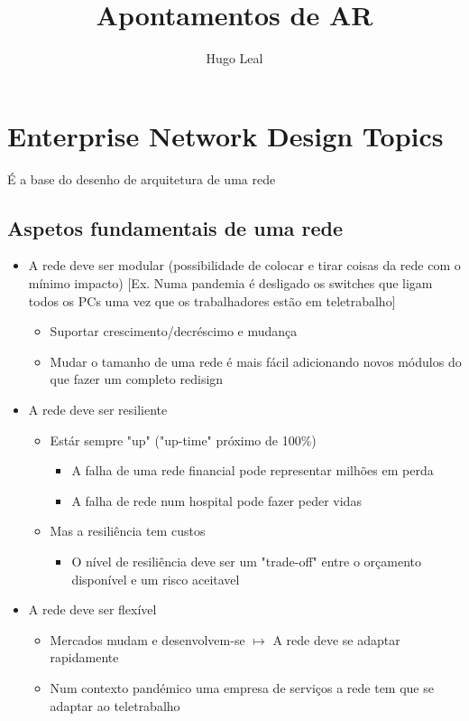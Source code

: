 \documentclass{easyclass}
\begin{document}
\begin{titlepage}
    \title{Apontamentos de AR}
    \author{Hugo Leal}
    \maketitle
\end{titlepage}

\tableofcontents
\clearpage

\section{Enterprise Network Design Topics}
É a base do desenho de arquitetura de uma rede 
\subsection{Aspetos fundamentais de uma rede}
\begin{itemize}
    \item A rede deve ser modular (possibilidade de colocar e tirar coisas da rede com o mínimo impacto) [Ex. Numa pandemia é desligado os switches que ligam todos os PCs uma vez que os trabalhadores estão em teletrabalho]
    \begin{itemize}
        \item Suportar crescimento/decréscimo e mudança
        \item Mudar o tamanho de uma rede é mais fácil adicionando novos módulos do que fazer um completo redisign
    \end{itemize}
    \item A rede deve ser resiliente
    \begin{itemize}
        \item Estár sempre "up" ("up-time" próximo de 100\%)
        \begin{itemize}
            \item A falha de uma rede financial pode representar milhões em perda
            \item A falha de rede num hospital pode fazer peder vidas
        \end{itemize}
        \item Mas a resiliência tem custos
        \begin{itemize}
            \item O nível de resiliência deve ser um "trade-off" entre o orçamento disponível e um risco aceitavel  
        \end{itemize}
    \end{itemize}
    \item A rede deve ser flexível
    \begin{itemize}
        \item Mercados mudam e desenvolvem-se $ \mapsto $ A rede deve se adaptar rapidamente
        \item Num contexto pandémico uma empresa de serviços a rede tem que se adaptar ao teletrabalho
    \end{itemize}
\end{itemize}
\end{document}
